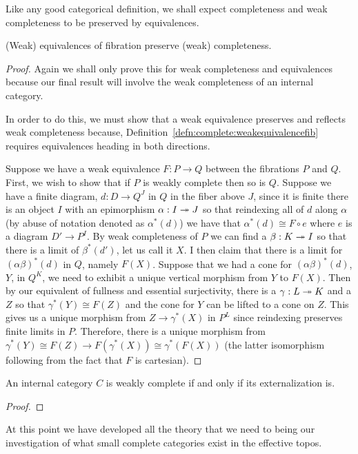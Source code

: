Like any good categorical definition, we shall expect completeness and
weak completeness to be preserved by equivalences.
\begin{thm}\label{thm:complete:completefibration}
  (Weak) equivalences of fibration preserve (weak) completeness.
\end{thm}
\begin{proof}
  Again we shall only prove this for weak completeness and
  equivalences because our final result will involve the weak
  completeness of an internal category.

  In order to do this, we must show that a weak equivalence preserves
  and reflects weak completeness because,
  Definition~\ref{defn:complete:weakequivalencefib} requires
  equivalences heading in both directions.

  Suppose we have a weak equivalence $F : P \to Q$ between the
  fibrations $P$ and $Q$. First, we wish to show that if $P$ is weakly
  complete then so is $Q$. Suppose we have a finite diagram,
  $d : D \to Q^J$ in $Q$ in the fiber above $J$, since it is finite
  there is an object $I$ with an epimorphism $\alpha : I \twoheadrightarrow J$ so
  that reindexing all of $d$ along $\alpha$ (by abuse of notation
  denoted as $\alpha^*(d)$) we have that $\alpha^*(d) \cong F \circ e$
  where $e$ is a diagram $D' \to P^I$. By weak completeness of $P$ we
  can find a $\beta : K \twoheadrightarrow I$ so that there is a limit of
  $\beta^*(d')$, let us call it $X$. I then claim that there is a
  limit for $(\alpha\beta)^*(d)$ in $Q$, namely $F(X)$. Suppose that
  we had a cone for $(\alpha\beta)^*(d)$, $Y$, in $Q^K$, we need to
  exhibit a unique vertical morphism from $Y$ to $F(X)$. Then by our
  equivalent of fullness and essential surjectivity, there is a
  $\gamma : L \twoheadrightarrow K$ and a $Z$ so that $\gamma^*(Y) \cong F(Z)$ and
  the cone for $Y$ can be lifted to a cone on $Z$. This gives us a
  unique morphism from $Z \to \gamma^*(X)$ in $P^L$ since reindexing
  preserves finite limits in $P$. Therefore, there is a unique
  morphism from
  $\gamma^*(Y) \cong F(Z) \to F(\gamma^*(X)) \cong \gamma^*(F(X))$
  (the latter isomorphism following from the fact that $F$ is
  cartesian).
\end{proof}

\begin{thm}\label{thm:complete:completeexternalization}
  An internal category $C$ is weakly complete if and only if its
  externalization is.
\end{thm}
\begin{proof}

\end{proof}
At this point we have developed all the theory that we need to being
our investigation of what small complete categories exist in the
effective topos.

